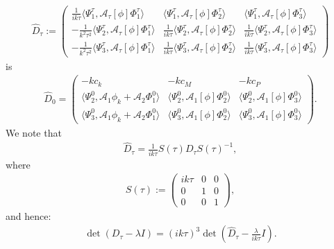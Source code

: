 \documentclass[11pt,leqno]{article}
\numberwithin{equation}{section}
\theoremstyle{definition}
\begin{document}
\begin{align*}
	\widehat{D}_{\tau} := \begin{pmatrix}
		\frac{1}{ik\tau}\langle \Psi_{1}^\tau,\mathcal{A}_\tau[\phi]\Phi_{1}^{\tau}\rangle & \langle \Psi_{1}^\tau,\mathcal{A}_\tau[\phi]\Phi_{2}^{\tau}\rangle & \langle \Psi_{1}^\tau,\mathcal{A}_\tau[\phi]\Phi_{3}^{\tau}\rangle\\
		-\frac{1}{k^{2}\tau^{2}}\langle \Psi_{2}^\tau,\mathcal{A}_\tau[\phi]\Phi_{1}^{\tau}\rangle & \frac{1}{ik\tau}\langle \Psi_{2}^\tau,\mathcal{A}_\tau[\phi]\Phi_{2}^{\tau}\rangle & \frac{1}{ik\tau}\langle \Psi_{2}^\tau,\mathcal{A}_\tau[\phi]\Phi_{3}^{\tau}\rangle\\
		-\frac{1}{k^{2}\tau^{2}}\langle \Psi_{3}^\tau,\mathcal{A}_\tau[\phi]\Phi_{1}^{\tau}\rangle & \frac{1}{ik\tau}\langle \Psi_{3}^\tau,\mathcal{A}_\tau[\phi]\Phi_{2}^{\tau}\rangle & \frac{1}{ik\tau}\langle \Psi_{3}^\tau,\mathcal{A}_\tau[\phi]\Phi_{3}^{\tau}\rangle
	\end{pmatrix}
\end{align*}
is
\begin{align}
	\widehat{D}_{0} = \begin{pmatrix}
		-kc_{k} & -kc_{M} & -kc_{P}\\
		\langle \Psi_{2}^{0},\mathcal{A}_{1}\phi_{k} + \mathcal{A}_{2}\Phi_{1}^{0}\rangle & \langle\Psi_{2}^{0},  \mathcal{A}_{1}[\phi]\Phi_{2}^{0}\rangle & \langle\Psi_{2}^{0},  \mathcal{A}_{1}[\phi]\Phi_{3}^{0}\rangle\\
		\langle \Psi_{3}^{0},\mathcal{A}_{1}\phi_{k} + \mathcal{A}_{2}\Phi_{1}^{0}\rangle & \langle\Psi_{3}^{0},  \mathcal{A}_{1}[\phi]\Phi_{2}^{0}\rangle & \langle\Psi_{3}^{0},  \mathcal{A}_{1}[\phi]\Phi_{3}^{0}\rangle
	\end{pmatrix}.
\end{align}
We note that
\begin{align*}
	\widehat{D}_{\tau} = \frac{1}{ik\tau}S(\tau)D_{\tau}S(\tau)^{-1},
\end{align*}
where
\begin{align*}
	S(\tau):= \begin{pmatrix}
		ik\tau & 0 & 0\\
		0 & 1 & 0\\
		0 & 0 & 1
	\end{pmatrix},
\end{align*}
and hence:
\begin{align}
	\det(D_{\tau} - \lambda I) = (ik\tau)^{3}\det(\widehat{D}_{\tau} - \frac{\lambda}{ik\tau}I). \label{eq:spectra}
\end{align}
\end{document}
